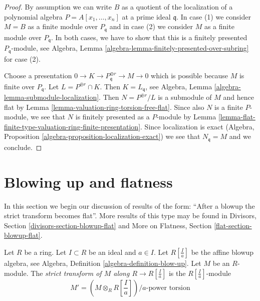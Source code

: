 \begin{proof}
By assumption we can write $B$ as a quotient of the localization of
a polynomial algebra $P = A[x_1, \ldots, x_n]$ at a prime ideal $\mathfrak q$.
In case (1) we consider $M = B$ as a finite module over
$P_\mathfrak q$ and in case (2) we consider $M$ as a finite module over
$P_\mathfrak q$. In both cases, we have to show that this is a
finitely presented $P_\mathfrak q$-module, see
Algebra, Lemma \ref{algebra-lemma-finitely-presented-over-subring}
for case (2).

\medskip\noindent
Choose a presentation $0 \to K \to P_\mathfrak q^{\oplus r} \to M \to 0$
which is possible because $M$ is finite over $P_\mathfrak q$.
Let $L = P^{\oplus r} \cap K$. Then $K = L_\mathfrak q$, see
Algebra, Lemma \ref{algebra-lemma-submodule-localization}.
Then $N = P^{\oplus r}/L$ is a submodule of $M$ and hence flat by
Lemma \ref{lemma-valuation-ring-torsion-free-flat}.
Since also $N$ is a finite $P$-module, we see that $N$ is finitely
presented as a $P$-module by
Lemma \ref{lemma-flat-finite-type-valuation-ring-finite-presentation}.
Since localization is exact
(Algebra, Proposition \ref{algebra-proposition-localization-exact})
we see that $N_\mathfrak q = M$ and we conclude.
\end{proof}











\section{Blowing up and flatness}
\label{section-blowup-flat}

\noindent
In this section we begin our discussion of results of the form: ``After a
blowup the strict transform becomes flat''. More results of this type may
be found in Divisors, Section \ref{divisors-section-blowup-flat} and
More on Flatness, Section \ref{flat-section-blowup-flat}.

\begin{definition}
\label{definition-strict-transform}
Let $R$ be a ring. Let $I \subset R$ be an ideal and $a \in I$.
Let $R[\frac{I}{a}]$ be the affine blowup algebra, see
Algebra, Definition \ref{algebra-definition-blow-up}.
Let $M$ be an $R$-module.
The {\it strict transform of $M$ along $R \to R[\frac{I}{a}]$} is
the $R[\frac{I}{a}]$-module
$$
M' = \left(M \otimes_R R[\textstyle{\frac{I}{a}}]\right)/a\text{-power torsion}
$$
\end{definition}


